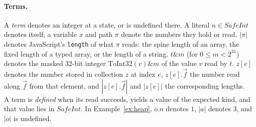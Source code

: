 \documentclass[10pt,a4paper]{article}
\theoremstyle{definition}
\theoremstyle{remark}
\newcommand{\len}[1]{|#1|}
\newcommand{\code}[1]{\texttt{#1}}
\begin{document}
\paragraph{Terms.} A \emph{term} denotes an integer at a state, or is
undefined there. A literal $n\in\mathit{SafeInt}$ denotes itself; a
variable $x$ and path $\pi$ denote the numbers they hold or read.
$\len\pi$ denotes JavaScript's \code{length} of what $\pi$ reads: the
spine length of an array, the fixed length of a typed array, or the
length of a string. $t\mathbin{\&}m$ (for $0\le m<2^{31}$) denotes the
masked 32-bit integer $\mathrm{ToInt32}(v)\mathbin{\&}m$ of the value $v$
read by $t$. $z[e]$ denotes the number stored in collection $z$ at
index $e$, $z[e].\vec f$ the number read along $\vec f$ from that
element, and $\len{z[e].\vec f}$ and $\len{z[e]}$ the corresponding
lengths. A term is \emph{defined} when its read succeeds, yields a value
of the expected kind, and that value lies in $\mathit{SafeInt}$. In
Example~\ref{ex:heap}, $o.n$ denotes $1$, $\len a$ denotes $3$, and
$\len o$ is undefined.
\end{document}
